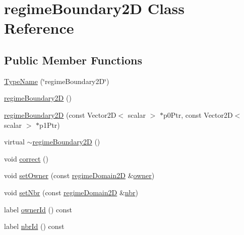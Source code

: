 \hypertarget{classFoam_1_1regimeMapModels_1_1regimeBoundary2D}{}\section{regime\+Boundary2D Class Reference}
\label{classFoam_1_1regimeMapModels_1_1regimeBoundary2D}
\subsection*{Public Member Functions}
\begin{DoxyCompactItemize}
\item 
\hyperlink{classFoam_1_1regimeMapModels_1_1regimeBoundary2D_acfeac61b6e664aa159c3196e8ee5d3f6}{Type\+Name} (\char`\"{}regime\+Boundary2D\char`\"{})
\item 
\hyperlink{classFoam_1_1regimeMapModels_1_1regimeBoundary2D_af07d3266278e71a928d97f0c7a01c2b4}{regime\+Boundary2D} ()
\item 
\hyperlink{classFoam_1_1regimeMapModels_1_1regimeBoundary2D_a97e5d791e7af21fdde323569b7154138}{regime\+Boundary2D} (const Vector2D$<$ scalar $>$ $\ast$p0\+Ptr, const Vector2D$<$ scalar $>$ $\ast$p1\+Ptr)
\item 
virtual \hyperlink{classFoam_1_1regimeMapModels_1_1regimeBoundary2D_aaf5740a78a49c12bb6afcf56e90ab6e9}{$\sim$regime\+Boundary2D} ()
\item 
void \hyperlink{classFoam_1_1regimeMapModels_1_1regimeBoundary2D_a3ae44b28050c3aa494c1d8e18cf618c1}{correct} ()
\item 
void \hyperlink{classFoam_1_1regimeMapModels_1_1regimeBoundary2D_af92676f05db1e6d8698e5cab71ceb98b}{set\+Owner} (const \hyperlink{classFoam_1_1regimeMapModels_1_1regimeDomain2D}{regime\+Domain2D} \&\hyperlink{classFoam_1_1regimeMapModels_1_1regimeBoundary2D_a70f1d293a30d911e12e9fac6d2564018}{owner})
\item 
void \hyperlink{classFoam_1_1regimeMapModels_1_1regimeBoundary2D_a90ec8a153ad5e759c8f21881745ad233}{set\+Nbr} (const \hyperlink{classFoam_1_1regimeMapModels_1_1regimeDomain2D}{regime\+Domain2D} \&\hyperlink{classFoam_1_1regimeMapModels_1_1regimeBoundary2D_acc6bbd0fa6b83bf723981af33e2edc6c}{nbr})
\item 
label \hyperlink{classFoam_1_1regimeMapModels_1_1regimeBoundary2D_a84a5e907d1672f7d42060335319dc663}{owner\+Id} () const
\item 
label \hyperlink{classFoam_1_1regimeMapModels_1_1regimeBoundary2D_ae8d16955c05a9c3f159e725fbfec832e}{nbr\+Id} () const

\end{DoxyCompactItemize}
